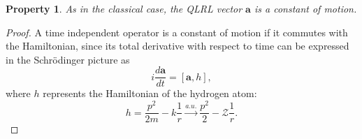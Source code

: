 \documentclass[12pt,a4paper]{report}
\newtheorem{property}{Property}[section]
\theoremstyle{definition}
\theoremstyle{remark}
\theoremstyle{remark}
\begin{document}
\begin{property}
As in the classical case, the QLRL vector $\textbf{a}$ is a constant of motion.
\end{property}
\begin{proof}
A time independent operator is a constant of motion if it commutes with the Hamiltonian, since its total derivative with respect to time can be expressed in the Schrödinger picture as
\begin{equation}\label{eqlrl3}
i\frac{d\textbf{a}}{dt}=[\textbf{a},h],
\end{equation}
where $h$ represents the Hamiltonian of the hydrogen atom:
\begin{equation}\label{eh1}
h=\frac{p^2}{2m}-k\frac{1}{r}\xrightarrow{a.u.}\frac{p^2}{2}-\mathcal{Z}\frac{1}{r}.
\end{equation}


\end{proof}
\end{document}
